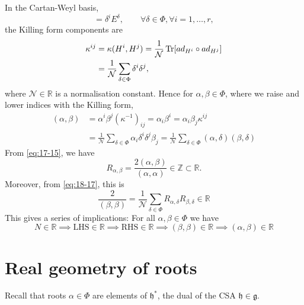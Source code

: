 
In the Cartan-Weyl basis,
\begin{equation}
  [H^{i}, E^{\delta}] = \delta^{i} E^{\delta}, \qquad \forall \delta \in \Phi, \forall i = 1, \dots, r,
\end{equation}
the Killing form components are
\begin{align}
  \kappa^{ij} &= \kappa(H^{i}, H^{j}) = \frac{1}{\mathcal{N}} \Tr[ad_{H^{i}} \circ ad_{H^{j}}] \\
   &= \frac{1}{\mathcal{N}} \sum_{\delta \in \Phi} \delta^{i} \delta^{j},
\end{align}
where $\mathcal{N} \in \mathbb{R}$ is a normalisation constant.
Hence for $\alpha, \beta \in \Phi$, where we raise and lower indices with the Killing form, 
\begin{align}
  (\alpha, \beta) &= \alpha^{i} \beta^{j}(\kappa^{-1})_{ij} = \alpha_{i} \beta^{i} = \alpha_{i} \beta_{j} \kappa^{ij} \\
		  &= \frac{1}{\mathcal{N}} \sum_{\delta \in \Phi} \alpha_{i} \delta^{i} \delta^{j} \beta_{j} = \frac{1}{\mathcal{N}} \sum_{\delta \in \Phi} (\alpha, \delta) (\beta,\delta) \label{eq:18-17}
\end{align}
From \eqref{eq:17-15}, we have
\begin{equation}
  R_{\alpha, \beta} = \frac{2 (\alpha, \beta)}{(\alpha, \alpha)} \in \mathbb{Z} \subset \mathbb{R}.
\end{equation}
Moreover, from \eqref{eq:18-17}, this is
\begin{equation}
  \frac{2}{(\beta, \beta)} = \frac{1}{\mathcal{N}} \sum_{\delta \in \Phi} R_{\alpha, \delta} R_{\beta, \delta} \in \mathbb{R}
\end{equation}
This gives a series of implications: For all $\alpha, \beta \in \Phi$ we have
\begin{equation}
  N \in \mathbb{R} \implies \text{LHS} \in \mathbb{R} \implies \text{RHS} \in \mathbb{R}
  \implies (\beta, \beta) \in \mathbb{R} \implies \boxed{(\alpha, \beta) \in \mathbb{R}}
\end{equation}

\section{Real geometry of roots}%
\label{sec:real_geometry_of_roots}

Recall that roots $\alpha \in \Phi$ are elements of $\mathfrak{h}^*$, the dual of the CSA $\mathfrak{h} \in \mathfrak{g}$.

